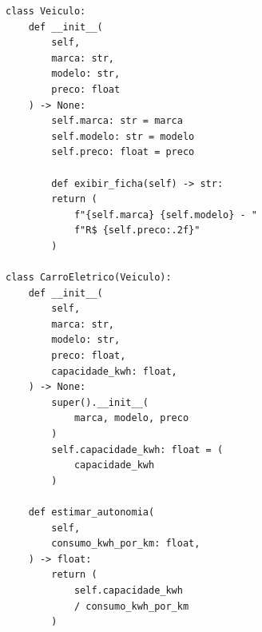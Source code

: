 \ifmostrarGabarito
\begin{verbatim}
class Veiculo:
    def __init__(
        self,
        marca: str,
        modelo: str,
        preco: float
    ) -> None:
        self.marca: str = marca
        self.modelo: str = modelo
        self.preco: float = preco

        def exibir_ficha(self) -> str:
        return (
            f"{self.marca} {self.modelo} - "
            f"R$ {self.preco:.2f}"
        )

class CarroEletrico(Veiculo):
    def __init__(
        self,
        marca: str,
        modelo: str,
        preco: float,
        capacidade_kwh: float,
    ) -> None:
        super().__init__(
            marca, modelo, preco
        )
        self.capacidade_kwh: float = (
            capacidade_kwh
        )

    def estimar_autonomia(
        self,
        consumo_kwh_por_km: float,
    ) -> float:
        return (
            self.capacidade_kwh
            / consumo_kwh_por_km
        )
\end{verbatim}

\fi
